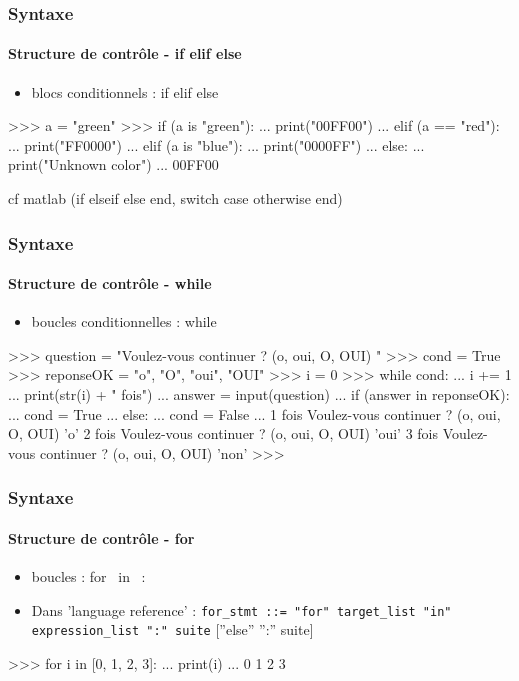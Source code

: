 \begin{frame}[fragile]
\frametitle{Syntaxe}
\framesubtitle{Structure de contrôle - if elif else}
\begin{itemize}
\item blocs conditionnels : if elif else
\end{itemize}
\begin{pythonConsole}
>>> a = "green"
>>> if (a is "green"): 
...     print("00FF00")
... elif (a == "red"): 
...     print("FF0000")
... elif (a is "blue"): 
...     print("0000FF")
... else: 
...     print("Unknown color")
...
00FF00
\end{pythonConsole}
cf matlab (if elseif else end, switch case otherwise end) 
\end{frame}
\begin{frame}[fragile]
\frametitle{Syntaxe}
\framesubtitle{Structure de contrôle - while}
\begin{itemize}
\item boucles conditionnelles : while
\end{itemize}
\begin{pythonConsole}
>>> question = "Voulez-vous continuer ? (o, oui, O, OUI) "
>>> cond = True
>>> reponseOK = {"o", "O", "oui", "OUI"}
>>> i = 0
>>> while cond:
...    i += 1
...    print(str(i) + " fois")
...    answer = input(question)
...    if (answer in reponseOK): 
...        cond = True
...    else: 
...        cond = False
...
1 fois 
Voulez-vous continuer ? (o, oui, O, OUI) 'o'
2 fois 
Voulez-vous continuer ? (o, oui, O, OUI) 'oui'
3 fois
Voulez-vous continuer ? (o, oui, O, OUI) 'non'
>>> 
\end{pythonConsole}
\end{frame}
\begin{frame}[fragile]
\frametitle{Syntaxe}
\framesubtitle{Structure de contrôle - for}
\begin{itemize}
\item boucles : for \ in \ :
\item Dans 'language reference' : \lstinline{for_stmt ::= "for" target_list "in" expression_list ":" suite}
[”else” ”:” suite]
\end{itemize}
\begin{pythonConsole}
>>> for i in [0, 1, 2, 3]: 
...     print(i)
... 
0
1
2
3
\end{pythonConsole}
\end{frame}
